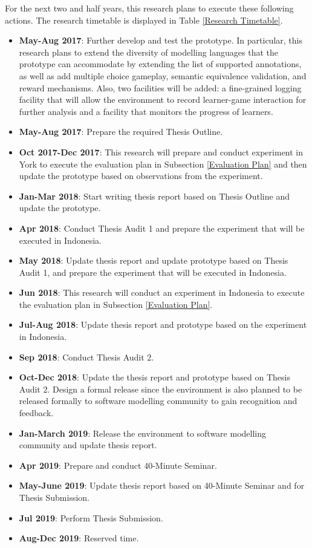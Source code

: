 \documentclass[12pt, a4paper]{report} \usepackage[titletoc]{appendix}
\begin{document}
For the next two and half years, this research plans to execute these following actions. The research timetable is displayed in Table \ref{Research Timetable}.
\begin{itemize}
\item \textbf{May-Aug 2017}: Further develop and test the prototype. In particular, this research plans to extend the diversity of modelling languages that the prototype can accommodate by extending the list of supported annotations, as well as add multiple choice gameplay, semantic equivalence validation, and reward mechanisms. Also, two facilities will be added: a fine-grained logging facility that will allow the environment to record learner-game interaction for further analysis and a facility that monitors the progress of learners. 
\item \textbf{May-Aug 2017}: Prepare the required Thesis Outline.
\item \textbf{Oct 2017-Dec 2017}: This research will prepare and conduct experiment in York to execute the evaluation plan in Subsection \ref{Evaluation Plan} and then update the prototype based on observations from the experiment.
\item \textbf{Jan-Mar 2018}: Start writing thesis report based on Thesis Outline and update the prototype. 
\item \textbf{Apr 2018}: Conduct Thesis Audit 1 and prepare the experiment that will be executed in Indonesia.
\item \textbf{May 2018}: Update thesis report and update prototype based on Thesis Audit 1, and prepare the experiment that will be executed in Indonesia. 
\item \textbf{Jun 2018}: This research will conduct an experiment in Indonesia to execute the evaluation plan in Subsection \ref{Evaluation Plan}.
\item \textbf{Jul-Aug 2018}: Update thesis report and prototype based on the experiment in Indonesia. 
\item \textbf{Sep 2018}: Conduct Thesis Audit 2. 
\item \textbf{Oct-Dec 2018}: Update the thesis report and prototype based on Thesis Audit 2. Design a formal release since the environment is also planned to be released formally to software modelling community to gain recognition and feedback.
\item \textbf{Jan-March 2019}: Release the environment to software modelling community and update thesis report. 
\item \textbf{Apr 2019}: Prepare and conduct 40-Minute Seminar. 
\item \textbf{May-June 2019}: Update thesis report based on 40-Minute Seminar and for Thesis Submission.
\item \textbf{Jul 2019}: Perform Thesis Submission.
\item \textbf{Aug-Dec 2019}: Reserved time.
\end{itemize}
\end{document}
